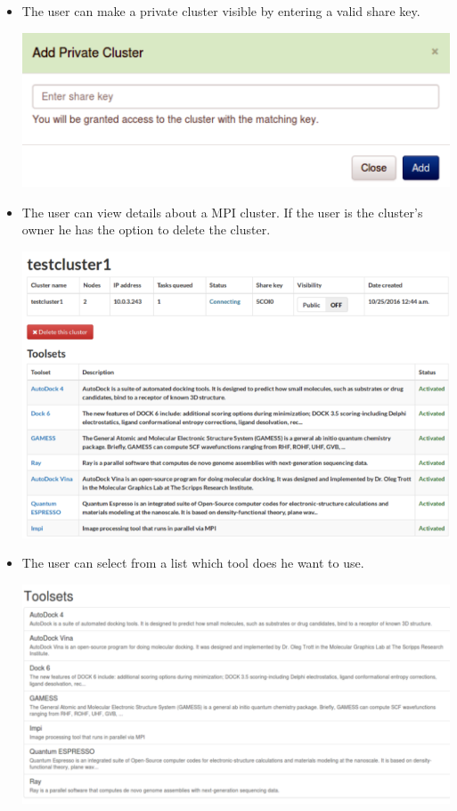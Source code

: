 \begin{itemize}
	
		\item The user can make a private cluster visible by entering a valid share key. \newline
		\begin{center}			
			\includegraphics[scale=0.50]{./images/add_private_cluster_2.png}		
		\end{center}	
		
		\item The user can view details about a MPI cluster. If the user is the cluster's owner he has the option to delete the cluster. \newline
		\begin{center}			
			\includegraphics[scale=0.40]{./images/mpi_detail_view_2.png}			
		\end{center}	
		
		\item The user can select from a list which tool does he want to use. 	
		\begin{center}			
			\includegraphics[scale=0.45]{./images/toolset_list_2.png}			
		\end{center}
		

\end{itemize}
